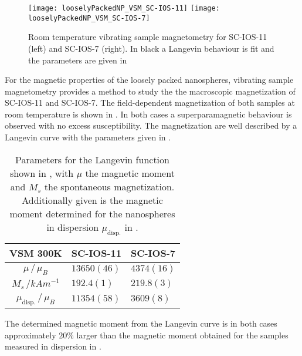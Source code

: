\documentclass[\main/dresen_thesis.tex]{subfiles}
\begin{document}
  \label{sec:looselyPackedNS:layer:vsm}
  \begin{figure}[tb]
    \centering
    \texttt{[image: looselyPackedNP\_VSM\_SC-IOS-11]}
    \texttt{[image: looselyPackedNP\_VSM\_SC-IOS-7]}
    \caption{\label{fig:looselyPackedNP:layer:vsm}Room temperature vibrating sample magnetometry for SC-IOS-11 (left) and SC-IOS-7 (right). In black a Langevin behaviour is fit and the parameters are given in }
  \end{figure}

  For the magnetic properties of the loosely packed nanospheres, vibrating sample magnetometry provides a method to study the the macroscopic magnetization of SC-IOS-11 and SC-IOS-7.
  The field-dependent magnetization of both samples at room temperature is shown in .
  In both cases a superparamagnetic behaviour is observed with no excess susceptibility.
  The magnetization are well described by a Langevin curve with the parameters given in .

  \begin{table}[!htbp]
    \centering
    \caption{\label{tab:looselyPackedNP:layer:vsm}Parameters for the Langevin function shown in , with $\mu$ the magnetic moment and $M_s$ the spontaneous magnetization. Additionally given is the magnetic moment determined for the nanospheres in dispersion $\mu_\mathrm{disp.}$ in .}
    \begin{tabular}{ c | l | l }
      \rule{0pt}{2ex} \textbf{VSM \@ 300K} & SC-IOS-11 & SC-IOS-7 \\
      \hline
      \rule{0pt}{2ex} $\mu \, / \, \mu_B$           & $13650(46)$   & $4374(16)$\\
      \rule{0pt}{2ex} $M_s \, /  \unit{kAm^{-1}}$   & $192.4(1)$    & $219.8(3)$\\
      \hline
      $\mu_\mathrm{disp.} \, / \, \mu_B$            & $11354(58)$   & $3609(8)$\\
      \hline
    \end{tabular}
  \end{table}
  The determined magnetic moment from the Langevin curve is in both cases approximately $20 \%$ larger than the magnetic moment obtained for the samples measured in dispersion in .
\end{document}
